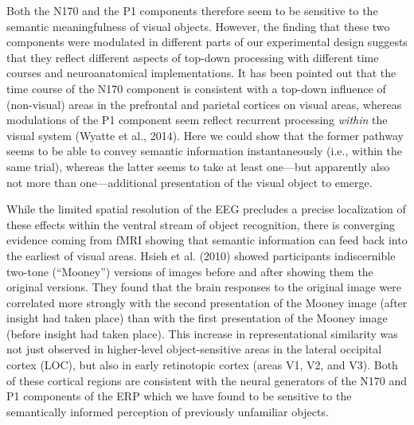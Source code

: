 \documentclass[
  english,
  man,floatsintext]{apa7}
\begin{document}
Both the N170 and the P1 components therefore seem to be sensitive to the semantic meaningfulness of visual objects. However, the finding that these two components were modulated in different parts of our experimental design suggests that they reflect different aspects of top-down processing with different time courses and neuroanatomical implementations. It has been pointed out that the time course of the N170 component is consistent with a top-down influence of (non-visual) areas in the prefrontal and parietal cortices on visual areas, whereas modulations of the P1 component seem reflect recurrent processing \emph{within} the visual system (Wyatte et al., 2014). Here we could show that the former pathway seems to be able to convey semantic information instantaneously (i.e., within the same trial), whereas the latter seems to take at least one---but apparently also not more than one---additional presentation of the visual object to emerge.

While the limited spatial resolution of the EEG precludes a precise localization of these effects within the ventral stream of object recognition, there is converging evidence coming from fMRI showing that semantic information can feed back into the earliest of visual areas. Hsieh et al. (2010) showed participants indiscernible two-tone (``Mooney'') versions of images before and after showing them the original versions. They found that the brain responses to the original image were correlated more strongly with the second presentation of the Mooney image (after insight had taken place) than with the first presentation of the Mooney image (before insight had taken place). This increase in representational similarity was not just observed in higher-level object-sensitive areas in the lateral occipital cortex (LOC), but also in early retinotopic cortex (areas V1, V2, and V3). Both of these cortical regions are consistent with the neural generators of the N170 and P1 components of the ERP which we have found to be sensitive to the semantically informed perception of previously unfamiliar objects.
\end{document}
